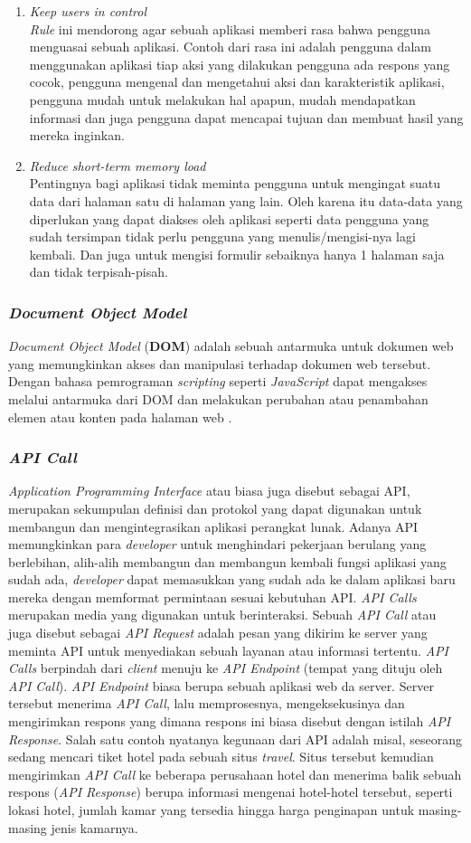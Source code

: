 \documentclass[a4paper]{article}
\newcommand{\subsubbab}[1]{%
    \subsubsection{#1}%
}
\begin{document}
\begin{enumerate}
    \item \textit{Keep users in control}\\
    \textit{Rule} ini mendorong agar sebuah aplikasi memberi rasa bahwa pengguna menguasai sebuah aplikasi. Contoh dari rasa ini adalah pengguna dalam menggunakan aplikasi tiap aksi yang dilakukan pengguna ada respons yang cocok, pengguna mengenal dan mengetahui aksi dan karakteristik aplikasi, pengguna mudah untuk melakukan hal apapun, mudah mendapatkan informasi dan juga pengguna dapat mencapai tujuan dan membuat hasil yang mereka inginkan.
    \item \textit{Reduce short-term memory load}\\
    Pentingnya bagi aplikasi tidak meminta pengguna untuk mengingat suatu data dari halaman satu di halaman yang lain. Oleh karena itu data-data yang diperlukan yang dapat diakses oleh aplikasi seperti data pengguna yang sudah tersimpan tidak perlu pengguna yang menulis/mengisi-nya lagi kembali. Dan juga untuk mengisi formulir sebaiknya hanya 1 halaman saja dan tidak terpisah-pisah.
\end{enumerate}

\subsubbab{\textit{Document Object Model}}
\textit{Document Object Model} (\textbf{DOM}) adalah sebuah antarmuka untuk dokumen web yang memungkinkan akses dan manipulasi terhadap dokumen web tersebut. Dengan bahasa pemrograman \textit{scripting} seperti \textit{JavaScript} dapat mengakses melalui antarmuka dari DOM dan melakukan perubahan atau penambahan elemen atau konten pada halaman web \autocite{DOM_teori}.

\subsubbab{\textit{API Call}}
\textit{Application Programming Interface} atau biasa juga disebut sebagai API, merupakan sekumpulan definisi dan protokol yang dapat digunakan untuk membangun dan mengintegrasikan aplikasi perangkat lunak\autocite{whats-api}. Adanya API memungkinkan para \textit{developer} untuk menghindari pekerjaan berulang yang berlebihan, alih-alih membangun dan membangun kembali fungsi aplikasi yang sudah ada, \textit{developer} dapat memasukkan yang sudah ada ke dalam aplikasi baru mereka dengan memformat permintaan sesuai kebutuhan API\autocite{whats-api-2}. \textit{API Calls} merupakan media yang digunakan untuk berinteraksi. Sebuah \textit{API Call} atau juga disebut sebagai \textit{API Request} adalah pesan yang dikirim ke server yang meminta API untuk menyediakan sebuah layanan atau informasi tertentu. \textit{API Calls} berpindah dari \textit{client} menuju ke \textit{API Endpoint} (tempat yang dituju oleh \textit{API Call}). \textit{API Endpoint} biasa berupa sebuah aplikasi web da server. Server tersebut menerima \textit{API Call}, lalu memprosesnya, mengeksekusinya dan mengirimkan respons yang dimana respons ini biasa disebut dengan istilah \textit{API Response}\autocite{whats-api-call}. Salah satu contoh nyatanya kegunaan dari API adalah misal, seseorang sedang mencari tiket hotel pada sebuah situs \textit{travel}. Situs tersebut kemudian mengirimkan \textit{API Call} ke beberapa perusahaan hotel dan menerima balik sebuah respons (\textit{API Response}) berupa informasi mengenai hotel-hotel tersebut, seperti lokasi hotel, jumlah kamar yang tersedia hingga harga penginapan untuk masing-masing jenis kamarnya.
\end{document}

